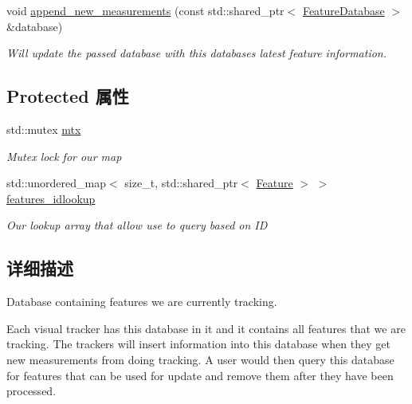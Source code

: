 \begin{DoxyCompactItemize}
\mbox{\label{classov__core_1_1FeatureDatabase_ae4e973b1f5b56efd62ba08df987723bc}} 
void \hyperlink{classov__core_1_1FeatureDatabase_ae4e973b1f5b56efd62ba08df987723bc}{append\+\_\+new\+\_\+measurements} (const std\+::shared\+\_\+ptr$<$ \hyperlink{classov__core_1_1FeatureDatabase}{Feature\+Database} $>$ \&database)
\begin{DoxyCompactList}\small\item\em Will update the passed database with this database\textquotesingle{}s latest feature information. \end{DoxyCompactList}\end{DoxyCompactItemize}
\subsection*{Protected 属性}
\begin{DoxyCompactItemize}
\item 
\mbox{\label{classov__core_1_1FeatureDatabase_abf963d2ada2d2263d0b9668ab3bb03b0}} 
std\+::mutex \hyperlink{classov__core_1_1FeatureDatabase_abf963d2ada2d2263d0b9668ab3bb03b0}{mtx}
\begin{DoxyCompactList}\small\item\em Mutex lock for our map \end{DoxyCompactList}\item 
\mbox{\label{classov__core_1_1FeatureDatabase_a132a312f68e252936633bfaf4a1fc044}} 
std\+::unordered\+\_\+map$<$ size\+\_\+t, std\+::shared\+\_\+ptr$<$ \hyperlink{classov__core_1_1Feature}{Feature} $>$ $>$ \hyperlink{classov__core_1_1FeatureDatabase_a132a312f68e252936633bfaf4a1fc044}{features\+\_\+idlookup}
\begin{DoxyCompactList}\small\item\em Our lookup array that allow use to query based on ID \end{DoxyCompactList}\end{DoxyCompactItemize}


\subsection{详细描述}
Database containing features we are currently tracking. 

Each visual tracker has this database in it and it contains all features that we are tracking. The trackers will insert information into this database when they get new measurements from doing tracking. A user would then query this database for features that can be used for update and remove them after they have been processed.



